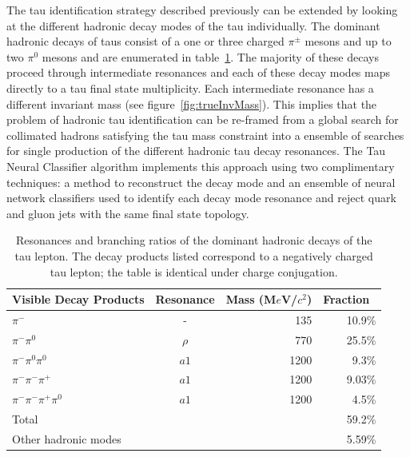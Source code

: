 The tau identification strategy described previously can be extended by
looking at the different hadronic decay modes of the tau individually.
The dominant hadronic decays of taus consist of a one or three charged
$\pi^{\pm}$ mesons and up to two $\pi^0$ mesons and are enumerated in
table~\ref{tab:decay_modes}.  The majority of these decays proceed through
intermediate resonances and each of these decay modes maps directly to a tau
final state multiplicity. Each intermediate resonance has a different invariant
mass (see figure~\ref{fig:trueInvMass}).  This implies that the problem of
hadronic tau identification can be re-framed from a global search for
collimated hadrons satisfying the tau mass constraint into a ensemble of
searches for single production of the different hadronic tau decay resonances.
The Tau Neural Classifier algorithm implements this approach using two
complimentary techniques: a method to reconstruct the decay mode and an
ensemble of neural network classifiers used to identify each decay mode
resonance and reject quark and gluon jets with the same final state topology.

\begin{table}
   \centering
   \begin{tabular}{ l c r r }
      Visible Decay Products  & Resonance & Mass (M$e$V/$c^2$) &
      Fraction~\cite{pdg} \\
      \hline
      $\pi^{-}$                    & -      & 135  & 10.9\% \\
      $\pi^{-}\pi^0$               & $\rho$ & 770  & 25.5\% \\
      $\pi^{-}\pi^0\pi^0$          & $a1$   & 1200 & 9.3\% \\
      $\pi^{-}\pi^{-}\pi^{+}$      & $a1$   & 1200 & 9.03\% \\
      $\pi^{-}\pi^{-}\pi^{+}\pi^0$ & $a1$   & 1200 & 4.5\% \\
      \hline
      Total & & & 59.2\% \\
      \hline
      Other hadronic modes & & & 5.59\% \\
   \end{tabular}
   \label{tab:decay_modes}
   \caption{Resonances and branching ratios of the dominant hadronic decays of
   the tau lepton.  The decay products listed correspond to a negatively
   charged tau lepton; the table is identical under charge conjugation.}
\end{table}

